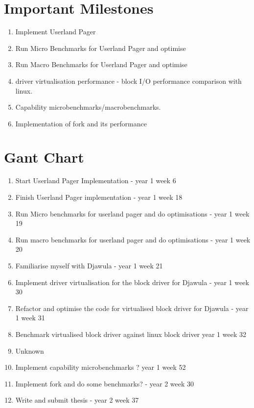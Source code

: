 \documentclass[../thesis.tex]{subfiles}
\begin{document}
\section{Important Milestones}

\begin{enumerate}
    \item Implement Userland Pager
    \item Run Micro Benchmarks for Userland Pager and optimise
    \item Run Macro Benchmarks for Userland Pager and optimise
    \item driver virtualisation performance - block I/O performance comparison with linux.
    \item Capability microbenchmarks/macrobenchmarks.
    \item Implementation of fork and its performance 
\end{enumerate}
\section{Gant Chart}
\begin{enumerate} 
    \item Start Userland Pager Implementation - year 1 week 6
    \item Finish Userland Pager implementation - year 1 week 18
    \item Run Micro benchmarks for userland pager and do optimisations - year 1 week 19
    \item Run macro benchmarks for userland pager and do optimisations - year 1 week 20
    \item Familiarise myself with Djawula - year 1 week 21
    \item Implement driver virtualisation for the block driver for Djawula - year 1 week 30
    \item Refactor and optimise the code for virtualised block driver for Djawula - year 1 week 31
    \item Benchmark virtualised  block driver against linux block driver year 1 week 32
    \item Unknown
    \item Implement capability microbenchmarks ? year 1 week 52
    \item Implement fork and do some benchmarks? - year 2 week 30
    \item Write and submit thesis - year 2 week 37
\end{enumerate}
\begin{figure}[H]
    \centering
    \resizebox{\textwidth}{!}{
        
    }
\end{figure}
\end{document}
